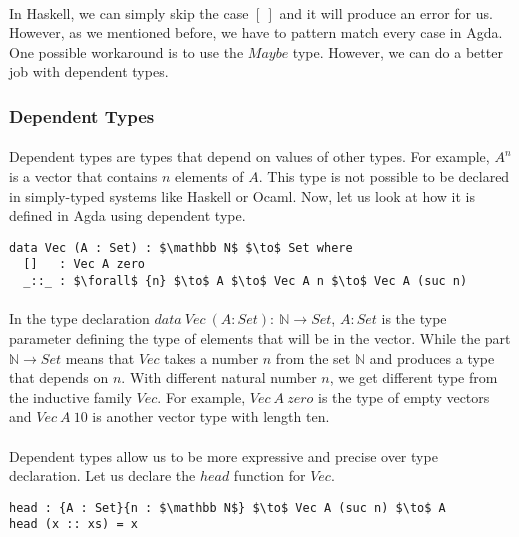 \paragraph{} In Haskell, we can simply skip the case
\([\ ]\) and it will produce an error for us. However, as we
mentioned before, we have to pattern match every case in Agda. One
possible workaround is to use the \(Maybe\) type. However, we can do a
better job with dependent types. 


\subsubsection{Dependent Types}
\paragraph{} Dependent types are types that depend on values of other
types. For example, \(A^n\) is a vector that contains \(n\) elements
of \(A\). This type is not possible
to be declared in simply-typed systems like Haskell or Ocaml. Now, let
us look at how it is defined in Agda using dependent type. 
\begin{lstlisting}[mathescape=true,xleftmargin=.25\textwidth]
data Vec (A : Set) : $\mathbb N$ $\to$ Set where
  []   : Vec A zero
  _::_ : $\forall$ {n} $\to$ A $\to$ Vec A n $\to$ Vec A (suc n)
\end{lstlisting} 

\paragraph{} In the type declaration \textbf{\(data\ Vec\ (A : Set) :\ \mathbb N \to
Set\)}, \(A : Set\) is the type parameter defining the type of
elements that will be in the vector. While the part \(\mathbb N \to Set\) means
that \(Vec\) takes a number \(n\) from the set \(\mathbb N\) and produces a
type that depends on \(n\). With different natural number
\(n\), we get different type from the inductive family \(Vec\). For example, \(Vec\ A\ zero\) is
the type of empty vectors and \(Vec\ A\ 10\) is another vector type with length ten. 


\paragraph{} Dependent types allow us to be more
expressive and precise over type declaration. Let us declare the
\(head\) function for \(Vec\). 
\begin{lstlisting}[mathescape=true,xleftmargin=.25\textwidth]
head : {A : Set}{n : $\mathbb N$} $\to$ Vec A (suc n) $\to$ A
head (x :: xs) = x 
\end{lstlisting} 

